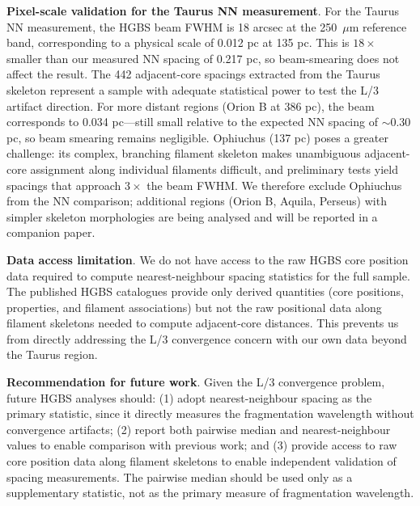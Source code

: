 \documentclass[twoside,twocolumn]{mnras}
\begin{document}
\textbf{Pixel-scale validation for the Taurus NN measurement}. For the Taurus NN measurement, the HGBS beam FWHM is 18 arcsec at the 250~$\mu$m reference band, corresponding to a physical scale of 0.012 pc at 135 pc. This is $18\times$ smaller than our measured NN spacing of 0.217 pc, so beam-smearing does not affect the result. The 442 adjacent-core spacings extracted from the Taurus skeleton represent a sample with adequate statistical power to test the L/3 artifact direction. For more distant regions (Orion B at 386 pc), the beam corresponds to 0.034 pc---still small relative to the expected NN spacing of $\sim$0.30 pc, so beam smearing remains negligible. Ophiuchus (137 pc) poses a greater challenge: its complex, branching filament skeleton makes unambiguous adjacent-core assignment along individual filaments difficult, and preliminary tests yield spacings that approach $3\times$ the beam FWHM. We therefore exclude Ophiuchus from the NN comparison; additional regions (Orion B, Aquila, Perseus) with simpler skeleton morphologies are being analysed and will be reported in a companion paper.

\textbf{Data access limitation}. We do not have access to the raw HGBS core position data required to compute nearest-neighbour spacing statistics for the full sample. The published HGBS catalogues provide only derived quantities (core positions, properties, and filament associations) but not the raw positional data along filament skeletons needed to compute adjacent-core distances. This prevents us from directly addressing the L/3 convergence concern with our own data beyond the Taurus region.

\textbf{Recommendation for future work}. Given the L/3 convergence problem, future HGBS analyses should: (1) adopt nearest-neighbour spacing as the primary statistic, since it directly measures the fragmentation wavelength without convergence artifacts; (2) report both pairwise median and nearest-neighbour values to enable comparison with previous work; and (3) provide access to raw core position data along filament skeletons to enable independent validation of spacing measurements. The pairwise median should be used only as a supplementary statistic, not as the primary measure of fragmentation wavelength.
\end{document}
